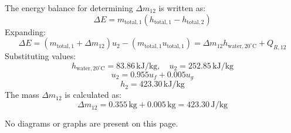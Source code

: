The energy balance for determining \( \Delta m_{12} \) is written as:  
\[
\Delta E = m_{\text{total},1} \left( h_{\text{total},1} - h_{\text{total},2} \right)
\]  
Expanding:  
\[
\Delta E = \left( m_{\text{total},1} + \Delta m_{12} \right) u_2 - \left( m_{\text{total},1} u_{\text{total},1} \right) = \Delta m_{12} h_{\text{water},20^\circ\text{C}} + Q_{R,12}
\]  
Substituting values:  
\[
h_{\text{water},20^\circ\text{C}} = 83.86 \, \text{kJ/kg}, \quad u_2 = 252.85 \, \text{kJ/kg}
\]  
\[
u_2 = 0.955 u_f + 0.005 u_g
\]  
\[
h_2 = 423.30 \, \text{kJ/kg}
\]  
The mass \( \Delta m_{12} \) is calculated as:  
\[
\Delta m_{12} = 0.355 \, \text{kg} + 0.005 \, \text{kg} = 423.30 \, \text{J/kg}
\]  

No diagrams or graphs are present on this page.